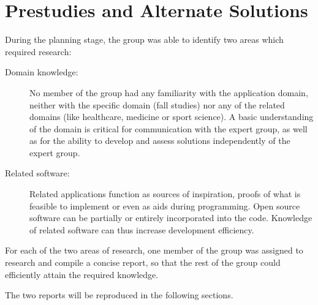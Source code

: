 \chapter{Prestudies and Alternate Solutions}
During the planning stage, the group was able to identify two areas which required research:
\begin{description}
\item[Domain knowledge:] No member of the group had any familiarity with the application domain, neither with the specific domain (fall studies) nor any of the related domains (like healthcare, medicine or sport science). A basic understanding of the domain is critical for communication with the expert group, as well as for the ability to develop and assess solutions independently of the expert group.
\item[Related software:] Related applications function as sources of inspiration, proofs of what is feasible to implement or even as aids during programming. Open source software can be partially or entirely incorporated into the code. Knowledge of related software can thus increase development efficiency.  
\end{description}
For each of the two areas of research, one member of the group was assigned to research and compile a concise report, so that the rest of the group could efficiently attain the required knowledge.   

The two reports will be reproduced in the following sections.








